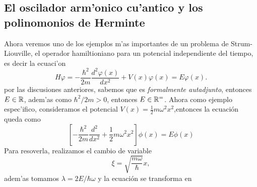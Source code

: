 \documentclass[main.tex]{subfiles}
\begin{document}
\subsection{El oscilador arm'onico cu'antico y los polinomonios de Herminte}
\noindent Ahora veremos uno de los ejemplos m'as importantes de un problema de Strum-Liouville, el operador hamiltioniano para un potencial independiente del tiempo, es decir la ecuaci'on
\begin{equation}\label{hamilton}
    H\varphi=-\frac{\hbar^2}{2m} \frac{d^2 \varphi(x)}{dx^2} + V(x) \varphi(x) = E \varphi(x).
\end{equation}
por las discusiones anteriores, sabemos que es \emph{formalmente autadjunto}, entonces $E\in\mathbb R $, adem'as como $\hbar^{2}/2m>0$, entonces $E\in\mathbb R ^{=}$. Ahora como ejemplo espec'ifico, consideramos el potencial $V(x) = \frac{1}{2}m\omega^{2}x^2$,entonces la ecuación queda como
\begin{equation}
\left[-\frac{\hbar^2}{2m}\frac{d^2}{dx^2} + \frac{1}{2}m\omega^2x^2\right]\phi(x) = E\phi(x)
\end{equation}
Para resoverla, realizamos el cambio de variable
\[
  \xi = \sqrt{\frac{m\omega}{\hbar}}x,
\]
\noindent adem'as tomamos $\lambda = 2E/\hbar\omega$ y la ecuación se transforma en
\end{document}
